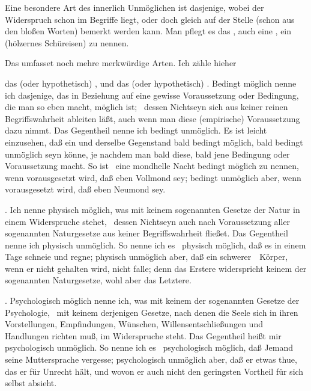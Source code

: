 \begin{aufza}
\begin{aufzb}
\end{aufzb}
\item Eine besondere Art des innerlich Unmöglichen ist dasjenige, wobei der Widerspruch schon im Begriffe liegt, oder doch gleich auf der Stelle (schon aus den bloßen Worten) bemerkt werden kann. Man pflegt es das , auch eine , ein  (hölzernes Schüreisen) zu nennen.
\item Das  umfasset noch mehre merkwürdige Arten. Ich zähle hieher
\begin{aufzb}
\item das  (oder hypothetisch) , und das  (oder hypothetisch) . Bedingt möglich nenne ich dasjenige, das in Beziehung auf eine gewisse Voraussetzung oder Bedingung, die man so eben macht, möglich ist; \dh\ dessen Nichtseyn sich aus keiner reinen Begriffswahrheit ableiten läßt, auch wenn man diese (empirische) Voraussetzung dazu nimmt. Das Gegentheil nenne ich bedingt unmöglich. Es ist leicht einzusehen, daß ein und derselbe Gegenstand bald bedingt möglich, bald bedingt unmöglich seyn könne, je nachdem man bald diese, bald jene Bedingung oder Voraussetzung macht. So ist \zB\ eine mondhelle Nacht bedingt möglich zu nennen, wenn vorausgesetzt wird, daß eben Vollmond sey; bedingt unmöglich aber, wenn vorausgesetzt wird, daß eben Neumond sey.
\item {}. Ich nenne physisch möglich, was mit keinem sogenannten Gesetze der Natur in einem Widerspruche stehet, \dh\ dessen Nichtseyn auch nach Voraussetzung aller sogenannten Naturgesetze aus keiner Begriffswahrheit fließet. Das Gegentheil nenne ich physisch unmöglich. So nenne ich es \zB\ physisch möglich, daß es in einem Tage schneie und regne; physisch unmöglich aber, daß ein schwerer~\ Körper, wenn er nicht gehalten wird, nicht falle; denn das Erstere widerspricht keinem der sogenannten Naturgesetze, wohl aber das Letztere.
\item {}. Psychologisch möglich nenne ich, was mit keinem der sogenannten Gesetze der Psychologie, \dh\ mit keinem derjenigen Gesetze, nach denen die Seele sich in ihren Vorstellungen, Empfindungen, Wünschen, Willensentschließungen und Handlungen richten muß, im Widerspruche steht. Das Gegentheil heißt mir psychologisch unmöglich. So nenne ich es \zB\ psychologisch möglich, daß Jemand seine Muttersprache vergesse; psychologisch unmöglich aber, daß er etwas thue, das er für Unrecht hält, und wovon er auch nicht den geringsten Vortheil für sich selbst absieht.

\end{aufzb}
\end{aufza}

